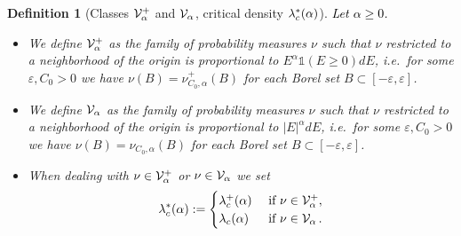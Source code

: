 \documentclass[12pt,a4paper,reqno]{amsart}
\newtheorem{TheoremA}{Theorem}
\newtheorem{Definition}[Theorem]{Definition}
\newcommand{\cV}{\ensuremath{\mathcal V}}
\newcommand{\bbP}{{\ensuremath{\mathbb P}} }
\let\a=\alpha \let\b=\beta   \let\d=\delta  \let\e=\varepsilon
\let\r=\rho  \let\s=\sigma \let\t=\tau   \let\th=\vartheta
\newcommand{\rosso}{\textcolor{black}} %
\newcommand{\be}{\begin{equation}}
\newcommand{\cv}{\rosso{\cV_\alpha}}
\newcommand{\cvp}{\rosso{\cV^+_\alpha}}
\begin{document}

\begin{Definition}[Classes $\cvp$ and $\cv$, critical density $\l_c^*(\a)$] \rosso{Let $\a\geq 0$.}
 \label{monte_pisciano} 
$\;\; $
\begin{itemize}
\item We define $\cvp$ as the family of probability measures $\nu$ such that $\nu$ restricted to a neighborhood of the origin is proportional to $E^\a \mathds{1}(E\geq 0) dE$, i.e.~for some $\e,C_0>0$   we have   $\nu(B)=\nu^+_{C_0,\a}(B) $ for each Borel set $B\subset[-\e,\e]$.
\item  We define $\cv$ as the family of  probability measures $\nu$ such that $\nu$ restricted to a   neighborhood of the origin is proportional to $|E|^\a  dE$,  i.e.~for some  $\e,C_0>0$  we have   $\nu(B)=\nu_{C_0,\a}(B) $ for each Borel set $B\subset[-\e,\e]$.
\item When dealing with $\nu \in \cvp$ or $\nu \in \cv$ we set
\begin{equation}\label{nuziale}
\l_c^*(\a):=
\begin{cases}
\l^+_c(\a) & \text{ if } \nu\in \cvp ,\\
\l_c(\a) & \text{ if } \nu \in \cv\,.\\
\end{cases}
\end{equation}
\end{itemize}

\end{Definition}
\end{document}

